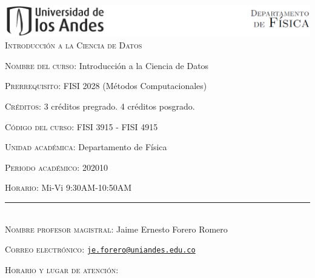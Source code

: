 \documentclass[letterpaper,10pt,onecolumn]{article}
\begin{document}
\begin{center}

\includegraphics[width=490pt]{header.png}\\[0.5cm]

\textsc{\LARGE Introducci\'on a la Ciencia de Datos}\\[0.1cm]

\end{center}

\large \noindent\textsc{Nombre del curso:}  Introducci\'on a la Ciencia de Datos%
  
\noindent\textsc{Prerrequisito:} FISI 2028 (M\'etodos Computacionales)%

\noindent\textsc{Cr\'editos:} 3 cr\'editos pregrado. 4 cr\'editos posgrado. %

\noindent\textsc{C\'odigo del curso:} FISI 3915 - FISI 4915 %

\noindent\textsc{Unidad acad\'emica:} Departamento de F\'isica

\noindent\textsc{Periodo acad\'emico:} 202010 %

\noindent\textsc{Horario:} Mi-Vi 9:30AM-10:50AM



\noindent\rule{\textwidth}{1pt}\\[-0.3cm]

\normalsize \noindent\textsc{Nombre profesor magistral:}
Jaime Ernesto Forero Romero%

\noindent\textsc{Correo electr\'onico:}
\href{mailto:je.forero@uniandes.edu.co}{\nolinkurl{je.forero@uniandes.edu.co}}

\noindent\textsc{Horario y lugar de atenci\'on:} 

\end{document}
